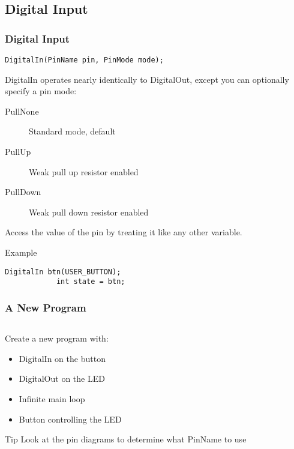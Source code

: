 \subsection{Digital Input}
\label{sub:digital_input}
\begin{frame}[fragile]
	\frametitle{Digital Input}
	\begin{lstlisting}[numbers=none]
		DigitalIn(PinName pin, PinMode mode);
	\end{lstlisting}
	DigitalIn operates nearly identically to DigitalOut, except you can optionally specify a pin mode:
	\begin{description}
		\item[PullNone] Standard mode, default
		\item[PullUp] Weak pull up resistor enabled
		\item[PullDown] Weak pull down resistor enabled
	\end{description}
	Access the value of the pin by treating it like any other variable.
	\begin{block}{Example}
		\begin{lstlisting}[numbers=none]
			DigitalIn btn(USER_BUTTON);
			int state = btn;
		\end{lstlisting}
	\end{block}
\end{frame}

\begin{frame}[fragile]
	\frametitle{A New Program}
	\begin{columns}[T]
		\begin{column}{0.5\textwidth}
			Create a new program with:
			\begin{itemize}
				\item DigitalIn on the button
				\item DigitalOut on the LED
				\item Infinite main loop
				\item Button controlling the LED
			\end{itemize}
			\begin{block}{Tip}
				Look at the pin diagrams to determine what PinName to use
			\end{block}
		\end{column}
		\begin{column}{0.5\textwidth}
			\pause
			
		\end{column}
	\end{columns}
\end{frame}

